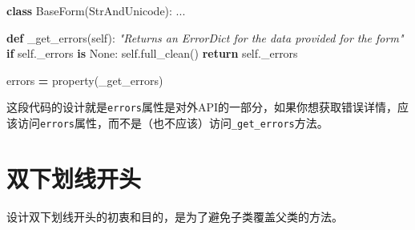 \documentclass[]{ctexbook}
\newenvironment{Shaded}{\begin{snugshade}}{\end{snugshade}}
\newcommand{\BuiltInTok}[1]{#1}
\newcommand{\CommentTok}[1]{\textcolor[rgb]{0.56,0.35,0.01}{\textit{#1}}}
\newcommand{\ControlFlowTok}[1]{\textcolor[rgb]{0.13,0.29,0.53}{\textbf{#1}}}
\newcommand{\KeywordTok}[1]{\textcolor[rgb]{0.13,0.29,0.53}{\textbf{#1}}}
\newcommand{\NormalTok}[1]{#1}
\newcommand{\OperatorTok}[1]{\textcolor[rgb]{0.81,0.36,0.00}{\textbf{#1}}}
\newcommand{\VariableTok}[1]{\textcolor[rgb]{0.00,0.00,0.00}{#1}}
\begin{document}
\begin{Shaded}
\begin{Highlighting}[]
\KeywordTok{class}\NormalTok{ BaseForm(StrAndUnicode):}
\NormalTok{    ...}

    \KeywordTok{def}\NormalTok{ _get_errors(}\VariableTok{self}\NormalTok{):}
        \CommentTok{"Returns an ErrorDict for the data provided for the form"}
        \ControlFlowTok{if} \VariableTok{self}\NormalTok{._errors }\KeywordTok{is} \VariableTok{None}\NormalTok{:}
            \VariableTok{self}\NormalTok{.full_clean()}
        \ControlFlowTok{return} \VariableTok{self}\NormalTok{._errors}

\NormalTok{    errors }\OperatorTok{=} \BuiltInTok{property}\NormalTok{(_get_errors)}
\end{Highlighting}
\end{Shaded}

这段代码的设计就是\texttt{errors}属性是对外API的一部分，如果你想获取错误详情，应该访问\texttt{errors}属性，而不是（也不应该）访问\texttt{\_get\_errors}方法。

\hypertarget{ux53ccux4e0bux5212ux7ebfux5f00ux5934}{%
\section{双下划线开头}\label{ux53ccux4e0bux5212ux7ebfux5f00ux5934}}

设计双下划线开头的初衷和目的，是为了避免子类覆盖父类的方法。
\end{document}
